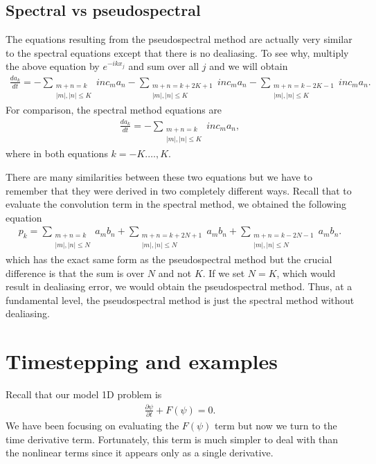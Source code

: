\subsection{Spectral vs pseudospectral}
The equations resulting from the pseudospectral method are actually very similar to the spectral equations except that there is no dealiasing. To see why, multiply the above equation by $e^{-ikx_{j}}$ and sum over all $j$ and we will obtain
\begin{align}
\frac{da_{k}}{dt}= -\sum_{\substack{m+n=k\\ |m|,|n|\le K}}inc_{m}a_{n}-\sum_{\substack{m+n=k+2K+1\\ |m|,|n|\le K}}inc_{m}a_{n}- \sum_{\substack{m+n=k-2K-1\\ |m|,|n|\le K}}inc_{m}a_{n}.
\end{align}
For comparison, the spectral method equations are
\begin{align} 
\frac{da_{k}}{dt} = -\sum_{\substack{m+n=k\\ |m|,|n|\le K}} inc_{m}a_{n},
\end{align}
where in both equations $k=-K.\ldots,K$. 

There are many similarities between these two equations but we have to remember that they were derived in two completely different ways. Recall that to evaluate the convolution term in the spectral method, we obtained the following equation
\begin{align}
p_{k} = \sum_{\substack{m+n=k\\ |m|,|n|\le N}}a_{m}b_{n}+  \sum_{\substack{m+n=k+2N+1\\ |m|,|n|\le N}}a_{m}b_{n}+ \sum_{\substack{m+n=k-2N-1\\ |m|,|n|\le N}}a_{m}b_{n}.
\end{align}
which has the exact same form as the pseudospectral method but the crucial difference is that the sum is over $N$ and not $K$. If we set $N=K$, which would result in dealiasing error, we would obtain the pseudospectral method. Thus, at a fundamental level, the pseudospectral method is just the spectral method without dealiasing.

\section{Timestepping and examples}
Recall that our model 1D problem is 
\begin{align}
\frac{\partial \psi}{\partial t} + F(\psi) = 0.
\end{align}
We have been focusing on evaluating the $F(\psi)$ term but now we turn to the time derivative term. Fortunately, this term is much simpler to deal with than the nonlinear terms since it appears only as a single derivative. 

